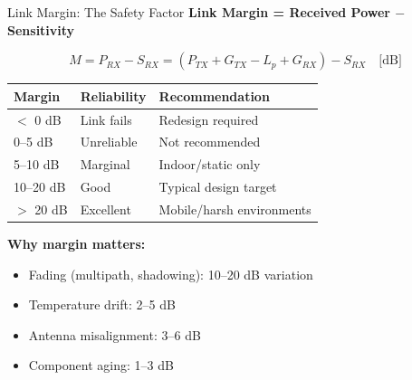 \documentclass[aspectratio=169,11pt]{beamer}
\begin{document}
\begin{frame}{Link Margin: The Safety Factor}
    \textbf{Link Margin = Received Power $-$ Sensitivity}
    
    \vspace{0.3cm}
    \[
    M = P_{RX} - S_{RX} = (P_{TX} + G_{TX} - L_p + G_{RX}) - S_{RX} \quad \text{[dB]}
    \]
    
    \vspace{0.3cm}
    \begin{table}
        \centering
        \begin{tabular}{@{}lll@{}}
            \toprule
            \textbf{Margin} & \textbf{Reliability} & \textbf{Recommendation} \\
            \midrule
            $<$ 0 dB & Link fails & Redesign required \\
            0--5 dB & Unreliable & Not recommended \\
            5--10 dB & Marginal & Indoor/static only \\
            10--20 dB & Good & Typical design target \\
            $>$ 20 dB & Excellent & Mobile/harsh environments \\
            \bottomrule
        \end{tabular}
    \end{table}
    
    \vspace{0.2cm}
    \textbf{Why margin matters:}
    \begin{itemize}
        \item Fading (multipath, shadowing): 10--20 dB variation
        \item Temperature drift: 2--5 dB
        \item Antenna misalignment: 3--6 dB
        \item Component aging: 1--3 dB
    \end{itemize}
\end{frame}
\end{document}
